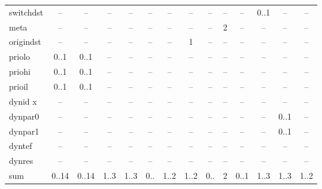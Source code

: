 \begin{table}
\begin{adjustwidth}{-24mm}{}
\begin{tabular}[t]{|p{17.4mm}|c|c|c|c|c|c|c|c|c|c|c|c|c|}
switchdst           & --         & --              & --        & --         & --           & --        & --          & --        & --         & --               & 0..1        & --        & --        \\
meta                & --         & --              & --        & --         & --           & --        & --          & --        & 2          & --               & --          & --        & --        \\
origindst           & --         & --              & --        & --         & --           & --        & 1           & --        & --         & --               & --          & --        & --        \\
priolo              & 0..1       & 0..1            & --        & --         & --           & --        & --          & --        & --         & --               & --          & --        & --        \\
priohi              & 0..1       & 0..1            & --        & --         & --           & --        & --          & --        & --         & --               & --          & --        & --        \\
prioil              & 0..1       & 0..1            & --        & --         & --           & --        & --          & --        & --         & --               & --          & --        & --        \\
dynid x             & --         & --              & --        & --         & --           & --        & --          & --        & --         & --               & --          & --        & --        \\
dynpar0             & --         & --              & --        & --         & --           & --        & --          & --        & --         & --               & --          & 0..1      & --        \\
dynpar1             & --         & --              & --        & --         & --           & --        & --          & --        & --         & --               & --          & 0..1      & --        \\
dyntef              & --         & --              & --        & --         & --           & --        & --          & --        & --         & --               & --          & --        & --        \\
dynres              & --         & --              & --        & --         & --           & --        & --          & --        & --         & --               & --          & --        & --        \\
\hline
sum                 & 0..14      & 0..14           & 1..3      & 1..3       & 0..          & 1..2      & 1..2        & 0..       & 2          & 0..1             & 1..3        & 1..3      & 1..2      \\
\hline
\end{tabular}
\end{adjustwidth}
\end{table}
